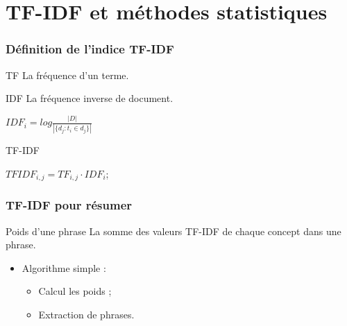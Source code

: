 \documentclass[12pt, handout]{beamer}
\begin{document}
 
 


\section{TF-IDF et méthodes statistiques}

\begin{frame}
 \frametitle{Définition de l'indice TF-IDF}
 \begin{block}{TF}
 	La fréquence d'un terme.
 \end{block}
 \begin{block}{IDF}
 	La fréquence inverse de document.\\
 	\begin{center}
 	 	$IDF_{i} =  log \frac{|D|}{|\{d_{j}: t_{i} \in d_{j}\}|}$
 	\end{center}
 \end{block}
 \begin{block}{TF-IDF}
 	\begin{center}
 		$TFIDF_{i,j} = TF_{i,j} \cdot  IDF_{i}$;
 	\end{center}
 \end{block}

 
 \end{frame}

\begin{frame}
 \frametitle{TF-IDF pour résumer}
  \begin{block}{Poids d'une phrase}
 	La somme des valeurs TF-IDF de chaque concept dans une phrase.
 \end{block}
 \begin{itemize}
  \item Algorithme simple :
  	\begin{itemize}
  	\item Calcul les poids ;
  	\item Extraction de phrases.
  	\end{itemize}
 \end{itemize}

 
\end{frame}
\end{document}
